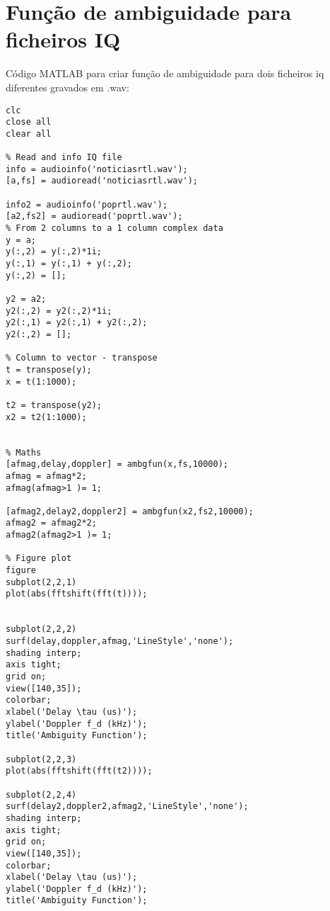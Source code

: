 
\chapter{Função de ambiguidade para ficheiros IQ} %

\label{AppendixA} %


Código MATLAB para criar função de ambiguidade para dois ficheiros iq diferentes gravados em .wav:

\begin{verbatim}
clc
close all
clear all

% Read and info IQ file
info = audioinfo('noticiasrtl.wav');
[a,fs] = audioread('noticiasrtl.wav');

info2 = audioinfo('poprtl.wav');
[a2,fs2] = audioread('poprtl.wav');
% From 2 columns to a 1 column complex data
y = a;
y(:,2) = y(:,2)*1i;
y(:,1) = y(:,1) + y(:,2);
y(:,2) = [];

y2 = a2;
y2(:,2) = y2(:,2)*1i;
y2(:,1) = y2(:,1) + y2(:,2);
y2(:,2) = [];

% Column to vector - transpose
t = transpose(y);
x = t(1:1000);

t2 = transpose(y2);
x2 = t2(1:1000);


% Maths
[afmag,delay,doppler] = ambgfun(x,fs,10000);
afmag = afmag*2;
afmag(afmag>1 )= 1;

[afmag2,delay2,doppler2] = ambgfun(x2,fs2,10000);
afmag2 = afmag2*2;
afmag2(afmag2>1 )= 1;

% Figure plot
figure
subplot(2,2,1)   
plot(abs(fftshift(fft(t))));


subplot(2,2,2)
surf(delay,doppler,afmag,'LineStyle','none'); 
shading interp;
axis tight; 
grid on; 
view([140,35]); 
colorbar;
xlabel('Delay \tau (us)');
ylabel('Doppler f_d (kHz)');
title('Ambiguity Function');

subplot(2,2,3)   
plot(abs(fftshift(fft(t2))));

subplot(2,2,4)   
surf(delay2,doppler2,afmag2,'LineStyle','none'); 
shading interp;
axis tight; 
grid on; 
view([140,35]); 
colorbar;
xlabel('Delay \tau (us)');
ylabel('Doppler f_d (kHz)');
title('Ambiguity Function');
\end{verbatim}
